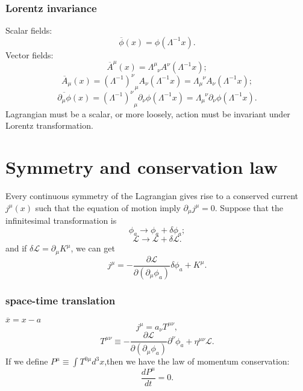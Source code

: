 \subsubsection{Lorentz invariance}

Scalar fields:
\[\overline{\phi}(x) = \phi(\Lambda^{-1} x).\]
Vector fields:
\[\overline{A}^{\mu}(x) = \Lambda^{\mu}_{\phantom{\mu}\nu} A^{\nu}(\Lambda^{-1}x);\]
\[\overline{A}_{\mu}(x) = (\Lambda^{-1})^{\nu}_{\phantom{\mu}\mu} A_{\nu}(\Lambda^{-1}x) = \Lambda_{\mu}^{\phantom{\mu}\nu}A_{\nu}(\Lambda^{-1}x);\]
\[\overline{\partial_{\mu}\phi}(x) = (\Lambda^{-1})^{\nu}_{\phantom{\mu}\mu} \partial_{\nu} \phi (\Lambda^{-1}x) = \Lambda_{\mu}^{\phantom{\mu}\nu} \partial_{\nu} \phi (\Lambda^{-1}x).\]
Lagrangian must be a scalar, or more loosely, action must be invariant under Lorentz transformation.

\section{Symmetry and conservation law}
\begin{newthem}
	Every continuous symmetry of the Lagrangian gives rise to a conserved current $j^{\mu}(x)$ such that the equation of motion imply $\partial_{\mu} j^{\mu} = 0$.
	Suppose that the infinitesimal transformation is
	\[\phi_a \rightarrow \phi_a + \delta \phi_a;\]
	\[\mathcal{L} \rightarrow  \mathcal{L} + \delta \mathcal{L} .\]
	and if $\delta \mathcal{L} = \partial_{\mu} K^{\mu}$, we can get
	\[j^{\mu} = -\frac{\partial \mathcal{L}}{\partial (\partial_{\mu} \phi_a)} \delta \phi_a + K^{\mu}.\]
\end{newthem}

\subsubsection{space-time translation}
$\overline{x} = x - a$ 
\[j^{\mu} = a_{\nu} T^{\mu \nu},\]
\[T^{\mu \nu} \equiv -\frac{\partial \mathcal{L}}{\partial(\partial_{\mu}\phi_a)} \partial^{\nu} \phi_a + \eta^{\mu \nu} \mathcal{L}.\]
If we define $P^{\mu} \equiv \int T^{0 \mu} d^3 x$,then we have the law of momentum conservation:
\[\frac{d P^{\mu}}{dt} = 0.\]

